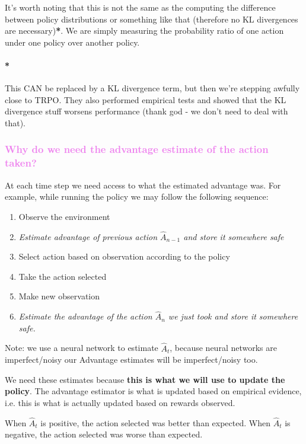 \documentclass{article}
\begin{document}
It's worth noting that this is not the same as the computing the difference between policy distributions or something like that (therefore no KL divergences are necessary)\textbf{*}. We are simply measuring the probability ratio of one action under one policy over another policy.

\paragraph{*}This CAN be replaced by a KL divergence term, but then we're stepping awfully close to TRPO. They also performed empirical tests and showed that the KL divergence stuff worsens performance (thank god - we don't need to deal with that).

\textcolor{violet}{\subsubsection{Why do we need the advantage estimate of the action taken?}}

At each time step we need access to what the estimated advantage was. For example, while running the policy we may follow the following sequence:
\begin{enumerate}
    \item Observe the environment
    \item \emph{Estimate advantage of previous action \(\hat{A}_{n-1}\) and store it somewhere safe} 
    \item Select action based on observation according to the policy
    \item Take the action selected 
    \item Make new observation
    \item \emph{Estimate the advantage of the action \(\hat{A}_{n}\) we just took and store it somewhere safe.} 
\end{enumerate}

Note: we use a neural network to estimate \(\hat{A}_{t}\), because neural networks are imperfect/noisy our Advantage estimates will be imperfect/noisy too. 

We need these estimates because \textbf{this is what we will use to update the policy}. The advantage estimator is what is updated based on empirical evidence, i.e. this is what is actually updated based on rewards observed.

When \(\hat{A}_{t}\) is positive, the action selected was better than expected.
When \(\hat{A}_{t}\) is negative, the action selected was worse than expected.
\end{document}

